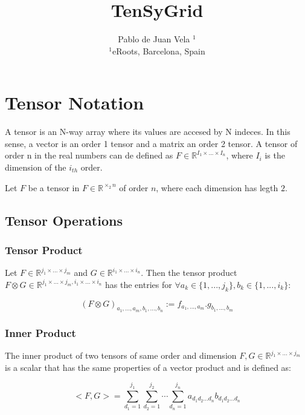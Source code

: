 \documentclass{article}
\title{TenSyGrid}
\author{Pablo de Juan Vela $^{1}$ \\
        \small $^{1}$eRoots, Barcelona, Spain \\
}
\date{}
\begin{document}
\maketitle


\section{Tensor Notation}

A tensor is an N-way array where its values are accesed by N indeces. In this sense, a vector is an order 1 tensor and a matrix an order 2 tensor.
A tensor of order n in the real numbers can de defined as $F \in \mathbb{R}^{I_1 \times ... \times I_n}$, where $I_i$ is the dimension of the $i_{th}$ order.

\begin{notation}
    Let $F$ be a tensor in $F \in \mathbb{R}^{\times_2 n }$ of order $n$, where each dimension has legth $2$.
\end{notation}

\subsection{Tensor Operations}


\subsubsection*{Tensor Product}
Let $F \in \mathbb{R}^{ j_1 \times ... \times j_m}$ and  
$G \in \mathbb{R}^{i_1 \times ... \times i_n }$. Then the tensor product 
$F \otimes G \in \mathbb{R}^{j_1 \times ... \times j_m, i_1 \times ... \times i_n }$ has
the entries for $\forall a_k \in \{1,...,j_k\}, b_k \in \{1,...,i_k\}$:

\begin{equation}
    (F \otimes G)_{a_1 , ... ,a_m,b_1 , ... ,b_n  } := f_{a_1,...,a_m}.g_{b_1,...,b_m}
\end{equation}

\subsubsection*{Inner Product}

The inner product of two tensors of same order and dimension $F, G \in \mathbb{R}^{ j_1 \times ... \times j_m}$
is a scalar that has the same properties of a vector product and is defined as:  

\begin{equation}
    <F,G> = \sum_{d_1=1}^{j_1} \sum_{d_2=1}^{j_2} \cdots \sum_{d_n=1}^{j_n} a_{d_1 d_2 \ldots d_n} b_{d_1 d_2 \ldots d_n}
\end{equation}
\end{document}
